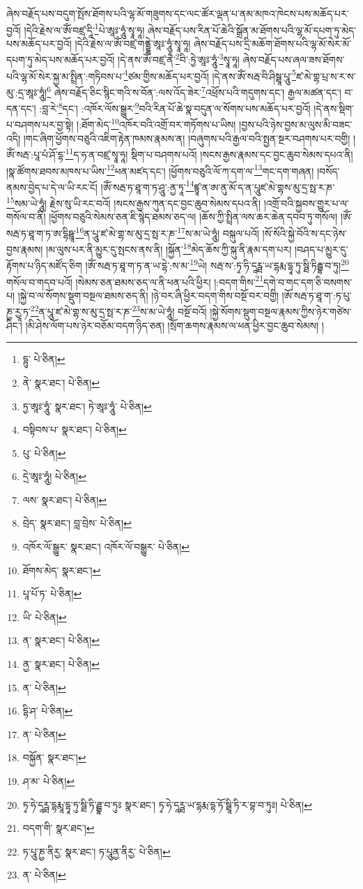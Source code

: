 ཞེས་བརྗོད་པས་བདུག་སྤོས་ཐོགས་པའི་ལྷ་མོ་གཟུགས་དང་ལང་ཚོར་ལྡན་པ་ནམ་མཁའ་ཁེངས་པས་མཆོད་པར་བྱའོ། །དེའི་རྗེས་ལ་ཨོཾ་བཛྲ་དཱི་\footnote{དྷུ་  པེ་ཅིན། }པེ་ཨཱཿ་ཧཱུཾ་སྭཱ་ཧཱ། ཞེས་བརྗོད་པས་རིན་པོ་ཆེའི་སྒྲོན་མ་ཐོགས་པའི་ལྷ་མོ་དཔག་ཏུ་མེད་པས་མཆོད་པར་བྱའོ། །དེའི་རྗེས་ལ་ཨོཾ་བཛྲ་གནྡྷེ་ཨཱཿ་ཧཱུཾ་སྭཱ་ཧཱ། ཞེས་བརྗོད་པས་དྲི་མཆོག་ཐོགས་པའི་ལྷ་མོ་སེར་མོ་དཔག་ཏུ་མེད་པས་མཆོད་པར་བྱའོ། །དེ་ནས་ཨོཾ་བཛྲ་ནཻ་\footnote{ནེ་  སྣར་ཐང་།  པེ་ཅིན། }བི་:ཏྱེ་ཨཱཿ་ཧཱུཾ་\footnote{ཏྱ་ཨཱཿ་ཧཱུཾ་  སྣར་ཐང་། ཏེ་ཨཱཿ་ཧཱུཾ་  པེ་ཅིན། }སྭཱ་ཧཱ། ཞེས་བརྗོད་པས་ཞལ་ཟས་ཐོགས་པའི་ལྷ་མོ་སེར་སྐྱ་མ་སྤྲིན་:གཏིབས་པ་\footnote{བསྟིབས་པ་  སྣར་ཐང་།  པེ་ཅིན། }ཙམ་གྱིས་མཆོད་པར་བྱའོ། །དེ་ནས་ཨོཾ་སརྦ་བི་ཤིསྠཱ་པཱུ་\footnote{པུ་  པེ་ཅིན། }ཛ་མེ་གྷ་པྲ་ས་ར་ས་མུ་:དྲ་ཨཱཿ་ཧཱུཾ།\footnote{དྲེ་ཨཱཿ་ཧཱུཾ།  པེ་ཅིན། } ཞེས་བརྗོད་ཅིང་སྙིང་གའི་ས་བོན་:ལས་འོད་ཟེར་\footnote{ལས་  སྣར་ཐང་།  པེ་ཅིན། }འཕྲོས་པའི་གདུགས་དང་། རྒྱལ་མཚན་དང་། བ་དན་དང་། :བླ་རེ་\footnote{བྲེད་  སྣར་ཐང་། བླ་བྲེས་  པེ་ཅིན། }དང་། :འཁོར་ལོས་སྒྱུར་\footnote{འཁོར་ལོ་སྒྱུར་  སྣར་ཐང་། འཁོར་ལོ་བསྒྱུར་  པེ་ཅིན། }བའི་རིན་པོ་ཆེ་སྣ་བདུན་ལ་སོགས་པས་མཆོད་པར་བྱའོ། །དེ་ནས་སྡིག་པ་བཤགས་པར་བྱ་སྟེ། །:ཐོག་མེད་\footnote{ཐོགས་མེད་  སྣར་ཐང་། }འཁོར་བའི་འགྲོ་བར་གཏོགས་པ་ཡིས། །བྱས་པའི་ཉེས་བྱས་མ་ལུས་མི་བཟང་འདི། །གང་ཞིག་ཕྱོགས་བཅུའི་འཇིག་རྟེན་ཁམས་རྣམས་ན། །བཞུགས་པའི་རྒྱལ་བའི་སྤྱན་སྔར་བཤགས་པར་བགྱི། །ཨོཾ་སརྦ་:པཱ་པཾ་ཤོ་དྷ་\footnote{པཱ་པོ་ཏ་  པེ་ཅིན། }ད་ཧ་ན་བཛྲ་སྭཱ་ཧཱ། སྡིག་པ་བཤགས་པའོ། །སངས་རྒྱས་རྣམས་དང་བྱང་ཆུབ་སེམས་དཔའ་ནི། །སྣ་ཚོགས་ཐབས་མཁས་པ་ཡིས་\footnote{ཡི་  པེ་ཅིན། }ཕན་མཛད་དང་། །ཕྱོགས་བཅུའི་ལོ་ཀ་དག་ལ་\footnote{ན་  སྣར་ཐང་།  པེ་ཅིན། }གང་དག་གཞན། །བསོད་ནམས་བྱེད་པ་དེ་ལ་ཡི་རང་ངོ། །ཨོཾ་སརྦ་ཏ་ཐཱ་ག་ཏ་ཤཱུ་:ནྱ་ཏཱ་\footnote{ནྱ་  སྣར་ཐང་།  པེ་ཅིན། }ཛྙཱ་ན་ཨ་ནུ་མོ་ད་ན་པཱུཛ་མེ་གྷས་མུ་དྲ་སྥ་ར་ཎ་\footnote{ན་  པེ་ཅིན། }སམ་ཡེ་ཧཱུཾ། རྗེས་སུ་ཡི་རང་བའོ། །སངས་རྒྱས་ཀུན་དང་བྱང་ཆུབ་སེམས་དཔའ་ནི། །འགྲོ་བའི་སྐྱབས་གྱུར་པ་ལ་གསོལ་བ་ནི། །ཕྱོགས་བཅུའི་སེམས་ཅན་ཇི་སྙེད་ཐམས་ཅད་ལ། །ཆོས་ཀྱི་སྤྲིན་ལས་ཆར་ཆེན་དབབ་ཏུ་གསོལ། །ཨོཾ་སརྦ་ཏ་ཐཱ་ག་ཏ་ཨ་དྷིཥྛཱ་\footnote{དྷི་ཤ་  པེ་ཅིན། }ན་པཱུ་ཛ་མེ་གྷ་ས་མུ་དྲ་སྥ་ར་ཎ་\footnote{ན་  པེ་ཅིན། }ས་མ་ཡེ་ཧཱུཾ། བསྐུལ་པའོ། །སོ་སོའི་སྐྱེ་བོའི་ས་དང་ཉེས་བྱས་རྣམས། །མ་ལུས་པར་ནི་མྱུར་དུ་སྤངས་ནས་ནི། །སྐྱོན་\footnote{བསྐྱོན་  སྣར་ཐང་། }མེད་ཆོས་ཀྱི་སྐུ་ནི་རྣམ་དག་པར། །བཤད་པ་མྱུར་དུ་རྟོགས་པ་ཉིད་མཛོད་ཅིག །ཨོཾ་སརྦ་ཏ་ཐཱ་ག་ཏ་ན་ཡ་དྷེ་:ས་མ་\footnote{ཤ་མ་  པེ་ཅིན། }ཡེ། སརྦ་ས་:ཏྭ་ཧི་དཱཪྠ་ཡ་དྷརྨ་དྷཱ་ཏུ་སྠི་ཏིརྦྷ་བ་ཏུ།\footnote{ཏྭ་ཧེ་དཱཪྠ་དྷརྨཱ་དྷཱ་ཏུ་སྠི་ཏི་ཌྦྷ་བ་ཏུཿ  སྣར་ཐང་། ཏྭ་ཧེ་དཱཪྠ་ཡ་དྷརྨ་དྷ་ཏོ་སྠཱི་ཏི་ར་བྷ་བ་ཏུཿ།  པེ་ཅིན། } གསོལ་བ་གདབ་པའོ། །སེམས་ཅན་ཐམས་ཅད་ལ་ནི་ཕན་པའི་ཕྱིར། །:བདག་གིས་\footnote{བདག་གི་  སྣར་ཐང་། }དགེ་བ་གང་དག་ཅི་བསགས་པ། །སྐྱེ་བ་ལ་སོགས་སྡུག་བསྔལ་ཐམས་ཅད་ནི། །ཉེ་བར་ཞི་ཕྱིར་བདག་གིས་བསྔོ་བར་བགྱི། །ཨོ་སརྦ་ཏ་ཐཱ་ག་:ཏ་པུ་ཎྱ་རྱཱ་ཏ་\footnote{ཏ་པཱུ་ཎྱ་ནིརྱ་  སྣར་ཐང་། ཏ་པཱུནྱ་ནིརྱ་  པེ་ཅིན། }ན་པཱུ་ཛ་མེ་གྷ་ས་མུ་དྲ་སྥ་ར་ཎ་\footnote{ན་  པེ་ཅིན། }ས་མ་ཡེ་ཧཱུཾ། བསྔོ་བའོ། །སྐྱེ་སོགས་སྡུག་བསྔལ་རྣམས་ཀྱིས་ཉེར་གཙེས་ཤིང་། །མི་ཤེས་ལོག་པས་ཉེར་བཅོམ་བདག་ཉིད་ཅན། །སྲོག་ཆགས་རྣམས་ལ་ཕན་ཕྱིར་བྱང་ཆུབ་སེམས། །
